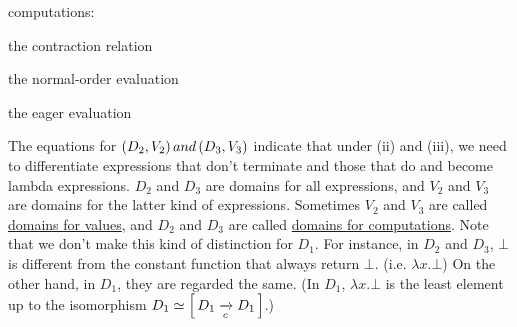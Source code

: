 \begin{enumcirc}
	computations:
	\begin{enumrm}
		\item
		the contraction relation
		\item
		the normal-order evaluation
		\item
		the eager evaluation
	\end{enumrm}
	The equations for $\left( D_2, V_2 \right) and \left( D_3, V_3 \right)$ indicate that under
	(ii) and (iii), we need to differentiate expressions that don't terminate and
	those that do and become lambda expressions.
	$D_2$ and $D_3$ are domains for all expressions, and $V_2$ and $V_3$ are domains
	for the latter kind of expressions.
	Sometimes $V_2$ and $V_3$ are called \ul{domains for values}, and $D_2$ and
	$D_3$ are called \ul{domains for computations}.
	Note that we don't make this kind of distinction for $D_1$.
	For instance, in $D_2$ and $D_3$, $\bot$ is different from the constant
	function that always return $\bot$. (i.e. $\lambda x. \bot$)
	On the other hand, in $D_1$, they are regarded the same.
	(In $D_1$, $\lambda x . \bot$ is the least element up to the isomorphism $D_1
		\simeq \left[ \, D_1 \xrightarrow[c]{} D_1 \, \right]$.)


\end{enumcirc}
